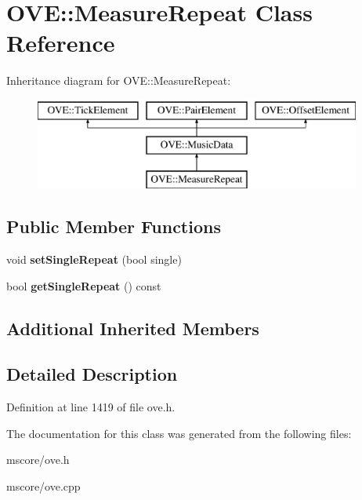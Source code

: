 \hypertarget{class_o_v_e_1_1_measure_repeat}{}\section{O\+VE\+:\+:Measure\+Repeat Class Reference}
\label{class_o_v_e_1_1_measure_repeat}
Inheritance diagram for O\+VE\+:\+:Measure\+Repeat\+:\begin{figure}[H]
\begin{center}
\leavevmode
\includegraphics[height=3.000000cm]{class_o_v_e_1_1_measure_repeat}
\end{center}
\end{figure}
\subsection*{Public Member Functions}
\begin{DoxyCompactItemize}
\item 
\mbox{\label{class_o_v_e_1_1_measure_repeat_adf7cef916deb8be184f94fc8f5a876cc}} 
void {\bfseries set\+Single\+Repeat} (bool single)
\item 
\mbox{\label{class_o_v_e_1_1_measure_repeat_a07bfef57dfcb37fcc1babfa0cbd10d9c}} 
bool {\bfseries get\+Single\+Repeat} () const
\end{DoxyCompactItemize}
\subsection*{Additional Inherited Members}


\subsection{Detailed Description}


Definition at line 1419 of file ove.\+h.



The documentation for this class was generated from the following files\+:\begin{DoxyCompactItemize}
\item 
mscore/ove.\+h\item 
mscore/ove.\+cpp\end{DoxyCompactItemize}

